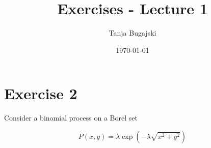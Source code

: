 \documentclass{article}
\title{Exercises - Lecture 1}
\author{Tanja Bugajski}
\date{\today}
\begin{document}
\maketitle

\section*{Exercise 2}
Consider a binomial process on a Borel set   

\[
P(x, y) = \lambda \exp(-\lambda \sqrt{x^2 + y^2})
\]
\end{document}
